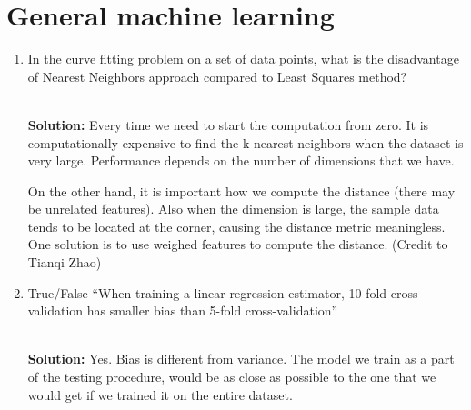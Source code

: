 
\section{General machine learning}

\begin{enumerate}
\item In the curve fitting problem on a set of data points, what is the disadvantage of Nearest Neighbors approach compared to Least Squares method?

\ \\{\bf Solution:} Every time we need to start the computation from zero. It is computationally expensive to find the k nearest neighbors when the dataset is very large. Performance depends on the number of dimensions that we have.

On the other hand, it is important how we compute the distance (there may be unrelated features). Also when the dimension is large, the sample data tends to be located at the corner, causing the distance metric meaningless. One solution is to use weighed features to compute the distance. (Credit to Tianqi Zhao) 

\item True/False ``When training a linear regression estimator, 10-fold cross-validation has smaller bias than 5-fold cross-validation''

\ \\{\bf Solution:} Yes. Bias is different from variance. The model we train as a part of the testing procedure, would be as close as possible to the one that we would get if we trained it on the entire dataset.
\end{enumerate}